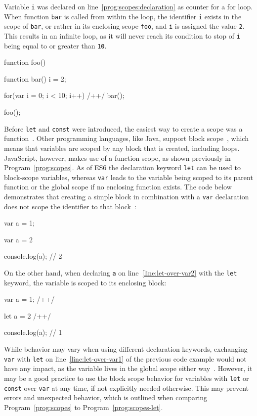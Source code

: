 \begin{program}
\caption{Variable \texttt{i} was declared on line~\ref{prog:scopes:declaration} as counter for a for loop. When function \texttt{bar} is called from within the loop, the identifier \texttt{i} exists in the scope of \texttt{bar}, or rather in its enclosing scope \texttt{foo}, and \texttt{i} is assigned the value \texttt{2}. This results in an infinite loop, as it will never reach its condition to stop of \texttt{i} being equal to or greater than \texttt{10}.~\cite[p.~26]{YDKJS:ScopesAndClosures:Simpson:2014}}
\label{prog:scopes}
\begin{JsCode}
function foo() {

  function bar() {
    i = 2;
  }
  
  for(var i = 0; i < 10; i++) { /+\label{prog:scopes:declaration}+/
    bar();
  }
  
}

foo();
\end{JsCode}
\end{program}

Before \texttt{let} and \texttt{const} were introduced, the easiest way to create a scope was a function~\cite[p.~7]{YDKJS:ES6AndBeyond:Simpson:2015}. Other programming languages, like Java, support block scope~\cite[p.~7]{YDKJS:ScopesAndClosures:Simpson:2014}, which means that variables are scoped by any block that is created, including loops. JavaScript, however, makes use of a function scope, as shown previously in Program~\ref{prog:scopes}. As of ES6 the declaration keyword \texttt{let} can be used to block-scope variables, whereas \texttt{var} leads to the variable being scoped to its parent function or the global scope if no enclosing function exists. The code below demonstrates that creating a simple block in combination with a \texttt{var} declaration does not scope the identifier to that block~\cite[p.~8]{YDKJS:ES6AndBeyond:Simpson:2015}:
\begin{JsCode}
var a = 1;

{
  var a = 2
}

console.log(a); // 2
\end{JsCode}
On the other hand, when declaring \texttt{a} on line~\ref{line:let-over-var2} with the \texttt{let} keyword, the variable is scoped to its enclosing block:
\begin{JsCode}
var a = 1; /+\label{line:let-over-var1}+/

{
  let a = 2 /+\label{line:let-over-var2}+/
}

console.log(a); // 1
\end{JsCode}
While behavior may vary when using different declaration keywords, exchanging \texttt{var} with \texttt{let} on line~\ref{line:let-over-var1} of the previous code example would not have any impact, as the variable lives in the global scope either way~\cites{variable-scope:Microsoft:2017, var:MDN:2017}. However, it may be a good practice to use the block scope behavior for variables with \texttt{let} or \texttt{const} over \texttt{var} at any time, if not explicitly needed otherwise. This may prevent errors and unexpected behavior, which is outlined when comparing Program~\ref{prog:scopes} to Program~\ref{prog:scopes-let}.

